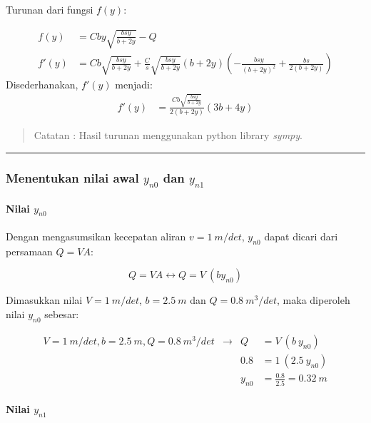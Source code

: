 \documentclass[10pt, a4paper]{article}
\begin{document}
Turunan dari fungsi \(f(y)\):

\[\begin{aligned}f(y) &= C b y \sqrt{\frac{b s y}{b + 2 y}} - Q \\
f'(y) &= C b \sqrt{\frac{b s y}{b + 2 y}} + \frac{C}{s} \sqrt{\frac{b s y}{b + 2 y}} \left(b + 2 y\right) \left(- \frac{b s y}{\left(b + 2 y\right)^{2}} + \frac{b s}{2 \left(b + 2 y\right)}\right) \end{aligned}\]
Disederhanakan, \(f'(y)\) menjadi:
\[\begin{aligned} f'(y) &= \frac{C b \sqrt{\frac{b s y}{b + 2 y}}}{2 \left(b + 2 y\right)} \left(3 b + 4 y\right) \end{aligned}\]

\begin{quote}
Catatan : Hasil turunan menggunakan python library \emph{sympy}.
\end{quote}

    \begin{center}\rule{0.5\linewidth}{\linethickness}\end{center}

\newpage
\subsubsection{\texorpdfstring{Menentukan nilai awal \(y_{n0}\) dan
\(y_{n1}\)}{Menentukan nilai awal y\_\{n0\} dan y\_\{n1\}}}\label{menentukan-nilai-awal-y_n0-dan-y_n1}

\paragraph{\texorpdfstring{Nilai
\(y_{n0}\)}{Nilai y\_\{n0\}}}\label{nilai-y_n0}

Dengan mengasumsikan kecepatan aliran \(v = 1\ m/det\), \(y_{n0}\) dapat
dicari dari persamaan \(Q = VA\):

\[Q = VA \leftrightarrow Q = V\ (by_{n0})\]

Dimasukkan nilai \(V = 1\ m/det\), \(b = 2.5\ m\) dan
\(Q = 0.8\ m^3/det\), maka diperoleh nilai \(y_{n0}\) sebesar:

\[\begin{aligned} V = 1\ m/det, b = 2.5\ m, Q = 0.8\ m^3/det &\rightarrow& Q &= V\ (b\ y_{n0}) \\
&& 0.8 &= 1\ (2.5\ y_{n0}) \\
&& y_{n0} &= \frac{0.8}{2.5} = 0.32\ m
\end{aligned}\]

\paragraph{\texorpdfstring{Nilai
\(y_{n1}\)}{Nilai y\_\{n1\}}}\label{nilai-y_n1}
\end{document}
